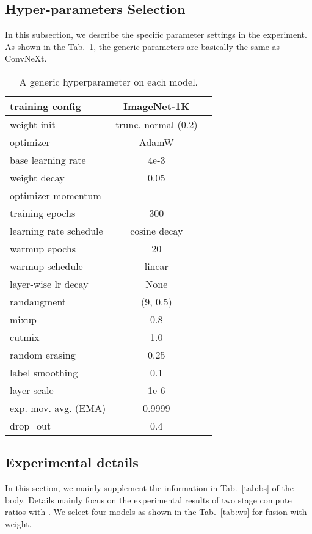 \documentclass[10pt,twocolumn,letterpaper]{article}
\begin{document}
\subsection{Hyper-parameters Selection}
\label{app:hyper-parameters-select}
In this subsection, we describe the specific parameter settings in the experiment. As shown in the Tab.~\ref{tab:train_detail}, the generic parameters are basically the same as ConvNeXt. 
\begin{table}[htbp]
  \centering
  \caption{A generic hyperparameter on each model.}
    \begin{tabular}{l|cc}
    \toprule
    training config & ImageNet-1K \\
    \midrule
    weight init & trunc. normal (0.2) \\
    optimizer & AdamW\\
    base learning rate & 4e-3 \\
    weight decay & 0.05  \\
    optimizer momentum & \\
    training epochs & 300\\
    learning rate schedule & cosine decay\\
    warmup epochs & 20\\
    warmup schedule & linear\\
    layer-wise lr decay & None \\
    randaugment & (9, 0.5)\\
    mixup & 0.8\\
    cutmix & 1.0 \\
    random erasing & 0.25\\
    label smoothing & 0.1\\
    layer scale & 1e-6\\
    exp. mov. avg. (EMA) & 0.9999\\
    drop\_out & 0.4\\
    \bottomrule
    \end{tabular}\label{tab:train_detail}\vspace{-1em}
\end{table}%
\subsection{Experimental details}
\label{app:Multi-stream result setting}
In this section, we mainly supplement the information in Tab.~\ref{tab:bs} of the body. Details mainly focus on the experimental results of two stage compute ratios with . We select four models as shown in the Tab.~\ref{tab:ws} for fusion with weight. 
\end{document}
